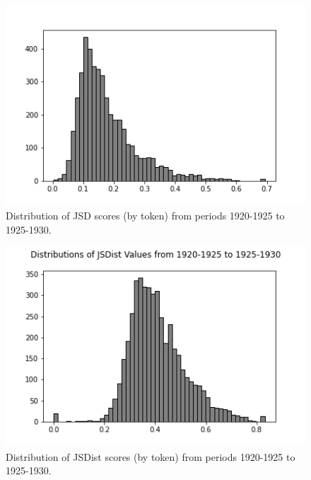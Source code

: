 \documentclass[10pt, a4paper]{article}
\begin{document}
\begin{figure}[!h]
\begin{center}
\includegraphics[scale=0.5]{code/distribution_imgs/1920_JSD.png}
\caption{Distribution of JSD scores (by token) from periods 1920-1925 to 1925-1930.}
\label{1920_JSD}
\end{center}
\end{figure}

\begin{figure}[!h]
\begin{center}
\includegraphics[scale=0.5]{code/distribution_imgs/1920_JSDist.png}
\caption{Distribution of JSDist scores (by token) from periods 1920-1925 to 1925-1930.}
\label{1920_JSDist}
\end{center}
\end{figure}
\end{document}
